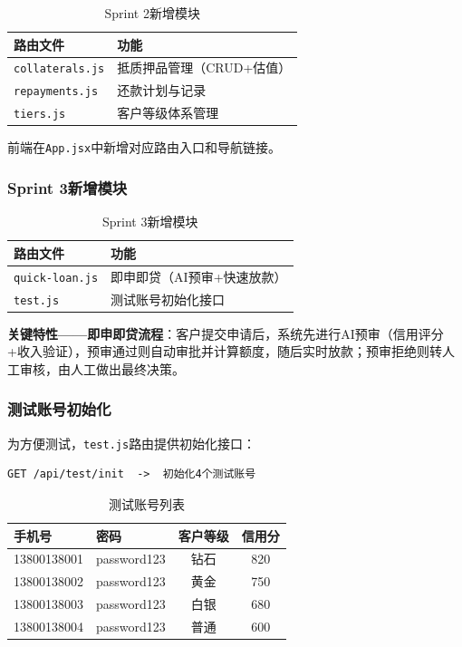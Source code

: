 \begin{table}[H]
\centering
\begin{tabular}{ll}
\toprule
\textbf{路由文件} & \textbf{功能} \\
\midrule
\texttt{collaterals.js} & 抵质押品管理（CRUD+估值） \\
\texttt{repayments.js} & 还款计划与记录 \\
\texttt{tiers.js} & 客户等级体系管理 \\
\bottomrule
\end{tabular}
\caption{Sprint 2新增模块}
\end{table}

前端在\texttt{App.jsx}中新增对应路由入口和导航链接。

\subsubsection*{Sprint 3新增模块}

\begin{table}[H]
\centering
\begin{tabular}{ll}
\toprule
\textbf{路由文件} & \textbf{功能} \\
\midrule
\texttt{quick-loan.js} & 即申即贷（AI预审+快速放款） \\
\texttt{test.js} & 测试账号初始化接口 \\
\bottomrule
\end{tabular}
\caption{Sprint 3新增模块}
\end{table}

\textbf{关键特性——即申即贷流程}：客户提交申请后，系统先进行AI预审（信用评分+收入验证），预审通过则自动审批并计算额度，随后实时放款；预审拒绝则转人工审核，由人工做出最终决策。

\subsubsection*{测试账号初始化}

为方便测试，\texttt{test.js}路由提供初始化接口：

\begin{lstlisting}[style=shell]
GET /api/test/init  ->  初始化4个测试账号
\end{lstlisting}

\begin{table}[H]
\centering
\begin{tabular}{llcc}
\toprule
\textbf{手机号} & \textbf{密码} & \textbf{客户等级} & \textbf{信用分} \\
\midrule
13800138001 & password123 & 钻石 & 820 \\
13800138002 & password123 & 黄金 & 750 \\
13800138003 & password123 & 白银 & 680 \\
13800138004 & password123 & 普通 & 600 \\
\bottomrule
\end{tabular}
\caption{测试账号列表}
\end{table}

